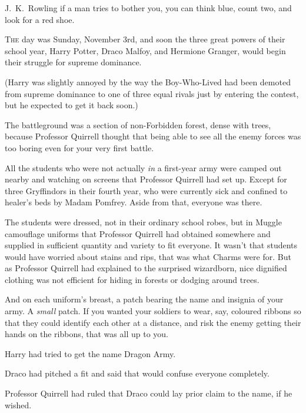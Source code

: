 
\begin{chapterOpeningAuthorNote}
J.~K.~Rowling if a man tries to bother you, you can think blue, count two, and look for a red shoe.
\end{chapterOpeningAuthorNote}

\lettrine{T}{he} day was Sunday, November 3rd, and soon the three great powers of their school year, Harry Potter, Draco Malfoy, and Hermione Granger, would begin their struggle for supreme dominance.

(Harry was slightly annoyed by the way the Boy-Who-Lived had been demoted from supreme dominance to one of three equal rivals just by entering the contest, but he expected to get it back soon.)

The battleground was a section of non-Forbidden forest, dense with trees, because Professor Quirrell thought that being able to see all the enemy forces was too boring even for your very first battle.

All the students who were not actually \emph{in} a first-year army were camped out nearby and watching on screens that Professor Quirrell had set up. Except for three Gryffindors in their fourth year, who were currently sick and confined to healer's beds by Madam Pomfrey. Aside from that, everyone was there.

The students were dressed, not in their ordinary school robes, but in Muggle camouflage uniforms that Professor Quirrell had obtained somewhere and supplied in sufficient quantity and variety to fit everyone. It wasn't that students would have worried about stains and rips, that was what Charms were for. But as Professor Quirrell had explained to the surprised wizardborn, nice dignified clothing was not efficient for hiding in forests or dodging around trees.

And on each uniform's breast, a patch bearing the name and insignia of your army. A \emph{small} patch. If you wanted your soldiers to wear, say, coloured ribbons so that they could identify each other at a distance, and risk the enemy getting their hands on the ribbons, that was all up to you.

Harry had tried to get the name Dragon Army.

Draco had pitched a fit and said that would confuse everyone completely.

Professor Quirrell had ruled that Draco could lay prior claim to the name, if he wished.

